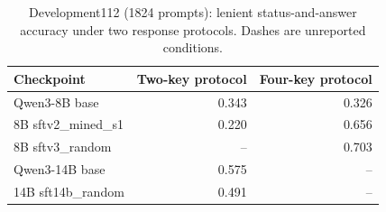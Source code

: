\begin{table}[t]
\caption{Development112 (1824 prompts): lenient status-and-answer accuracy under two response protocols. Dashes are unreported conditions.}\label{t:transfer}
\centering\small
\setlength{\tabcolsep}{4pt}
\begin{tabular}{lrr}
\toprule
Checkpoint & Two-key protocol & Four-key protocol\\\midrule
Qwen3-8B base & 0.343 & 0.326\\
8B sftv2\_mined\_s1 & 0.220 & 0.656\\
8B sftv3\_random & -- & 0.703\\
Qwen3-14B base & 0.575 & --\\
14B sft14b\_random & 0.491 & --\\
\bottomrule
\end{tabular}
\end{table}
